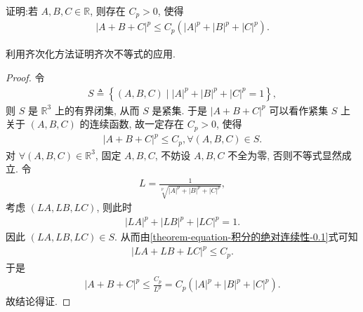 \documentclass[../../main.tex]{subfiles}%
\begin{document}
\begin{lemma}\label{lemma:齐次化方法应用(三元p次方)}
证明:若 $A,B,C\in \mathbb{R}$, 则存在 $C_p>0$, 使得
\begin{align*}
|A + B + C|^p \leqslant C_p(|A|^p + |B|^p + |C|^p).
\end{align*}
\end{lemma}
\begin{note}
利用齐次化方法证明齐次不等式的应用.
\end{note}
\begin{proof}

令
\begin{align*}
S \triangleq \left\{ (A,B,C) \mid |A|^p + |B|^p + |C|^p = 1 \right\},
\end{align*}
则 $S$ 是 $\mathbb{R}^3$ 上的有界闭集, 从而 $S$ 是紧集. 于是 $|A + B + C|^p$ 可以看作紧集 $S$ 上关于 $(A,B,C)$ 的连续函数, 故一定存在 $C_p > 0$, 使得
\begin{align}
|A + B + C|^p \leqslant C_p, \forall (A,B,C) \in S. \label{theorem-equation-积分的绝对连续性-0.1}
\end{align}
对 $\forall (A,B,C) \in \mathbb{R}^3$, 固定 $A,B,C$, 不妨设 $A,B,C$ 不全为零, 否则不等式显然成立. 令
\begin{align*}
L = \frac{1}{\sqrt[p]{|A|^p + |B|^p + |C|^p}},
\end{align*}
考虑 $(LA,LB,LC)$, 则此时
\begin{align*}
|LA|^p + |LB|^p + |LC|^p = 1.
\end{align*}
因此 $(LA,LB,LC) \in S$. 从而由\eqref{theorem-equation-积分的绝对连续性-0.1}式可知
\begin{align*}
|LA + LB + LC|^p \leqslant C_p.
\end{align*}
于是
\begin{align*}
|A + B + C|^p \leqslant \frac{C_p}{L^p} = C_p(|A|^p + |B|^p + |C|^p).
\end{align*}
故结论得证. 

\end{proof}
\end{document}
